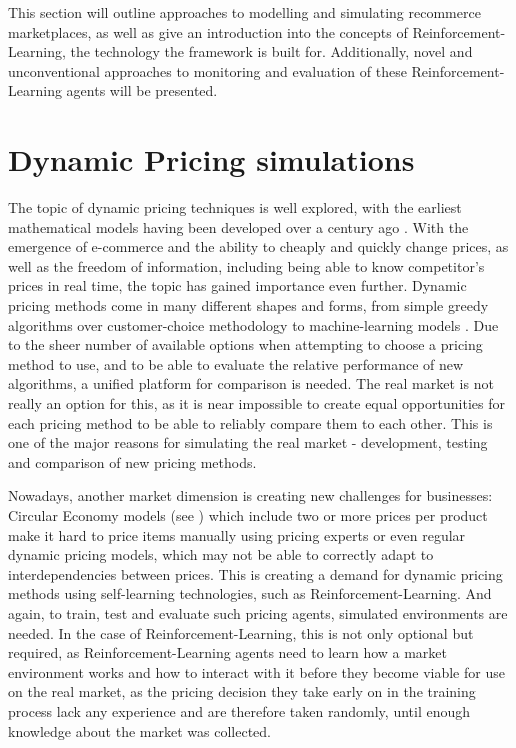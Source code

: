 \begin{jointwork}\label{ch:RelatedWork}
	This section will outline approaches to modelling and simulating recommerce marketplaces, as well as give an introduction into the concepts of Reinforcement-Learning, the technology the framework is built for. Additionally, novel and unconventional approaches to monitoring and evaluation of these Reinforcement-Learning agents will be presented.
\end{jointwork}

\section*{Dynamic Pricing simulations}

The topic of dynamic pricing techniques is well explored, with the earliest mathematical models having been developed over a century ago \cite{DynamicPricingHistory}. With the emergence of e-commerce and the ability to cheaply and quickly change prices, as well as the freedom of information, including being able to know competitor's prices in real time, the topic has gained importance even further. Dynamic pricing methods come in many different shapes and forms, from simple greedy algorithms over customer-choice methodology to machine-learning models \cite{deGeerPricing}. Due to the sheer number of available options when attempting to choose a pricing method to use, and to be able to evaluate the relative performance of new algorithms, a unified platform for comparison is needed. The real market is not really an option for this, as it is near impossible to create equal opportunities for each pricing method to be able to reliably compare them to each other. This is one of the major reasons for simulating the real market - development, testing and comparison of new pricing methods.

Nowadays, another market dimension is creating new challenges for businesses: Circular Economy models (see ) which include two or more prices per product make it hard to price items manually using pricing experts or even regular dynamic pricing models, which may not be able to correctly adapt to interdependencies between prices. This is creating a demand for dynamic pricing methods using self-learning technologies, such as Reinforcement-Learning. And again, to train, test and evaluate such pricing agents, simulated environments are needed. In the case of Reinforcement-Learning, this is not only optional but required, as Reinforcement-Learning agents need to learn how a market environment works and how to interact with it before they become viable for use on the real market, as the pricing decision they take early on in the training process lack any experience and are therefore taken randomly, until enough knowledge about the market was collected.

